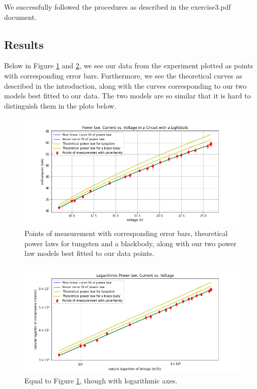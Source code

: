 \documentclass[letterpaper,12pt]{article}
\begin{document}
We successfully followed the procedures as described in the exercise3.pdf document\cite{lab-manual-ex2}.

\subsection{Results}
Below in Figure \ref{power-law} and \ref{power-law-log}, we see our data from the experiment plotted as points with 
corresponding error bars. Furthermore, we see the theoretical curves as described in the introduction, 
along with the curves corresponding to our two models best fitted to our data. 
The two models are so similar that it is hard to distinguish them in the plots below.

\begin{figure}[H]
  \centering
  \includegraphics[width=0.95\linewidth]{../Exercise3/Power_law.png}    
  \caption{Points of measurement with corresponding error bars, theoretical power laws for 
  tungsten and a blackbody, along with our two power law models best fitted to our data 
  points.}
  \label{power-law}
\end{figure}

\begin{figure}[H]
  \centering
  \includegraphics[width=0.95\linewidth]{../Exercise3/Log_Power_law.png}    
  \caption{Equal to Figure \ref{power-law}, though with logarithmic axes.}
  \label{power-law-log}
\end{figure}
\end{document}
